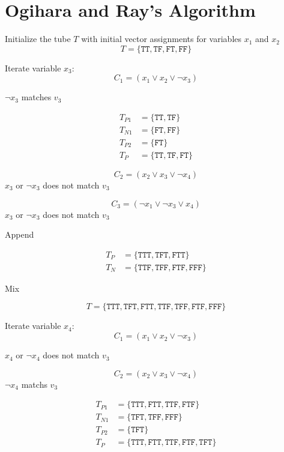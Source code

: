 \section{Ogihara and Ray's Algorithm}

Initialize the tube $T$ with initial vector assignments for variables $x_1$ and $x_2$
\[
	T = \{\texttt{TT}, \texttt{TF}, \texttt{FT}, \texttt{FF}\}
\]

\noindent Iterate variable $x_3$:
\[
C_1 = (x_1 \vee x_2 \vee \neg x_3)
\]

\noindent $\neg x_3$ matches $v_3$

\begin{align*}
T_{P1} &= \{\texttt{TT}, \texttt{TF}\}\\
T_{N1} &= \{\texttt{FT}, \texttt{FF}\}\\
T_{P2} &= \{\texttt{FT}\}\\
T_P &= \{\texttt{TT}, \texttt{TF}, \texttt{FT}\}
\end{align*}

\[
C_2 = (x_2 \vee x_3 \vee \neg x_4)
\]
\noindent $x_3$ or $\neg x_3$ does not match $v_3$

\[
C_3 = (\neg x_1 \vee \neg x_3 \vee x_4)
\]
\noindent $x_3$ or $\neg x_3$ does not match $v_3$

\noindent Append

\begin{align*}
T_P &= \{\texttt{TTT}, \texttt{TFT}, \texttt{FTT}\}\\
T_N &= \{\texttt{TTF}, \texttt{TFF}, \texttt{FTF}, \texttt{FFF}\}
\end{align*}

\noindent Mix

\[
T = \{\texttt{TTT}, \texttt{TFT}, \texttt{FTT}, \texttt{TTF}, \texttt{TFF}, \texttt{FTF}, \texttt{FFF}\}
\]


\noindent Iterate variable $x_4$:
\[
C_1 = (x_1 \vee x_2 \vee \neg x_3)
\]

\noindent $x_4$ or $\neg x_4$ does not match $v_3$

\[
C_2 = (x_2 \vee x_3 \vee \neg x_4)
\]
\noindent $\neg x_4$ matchs $v_3$

\begin{align*}
T_{P1} &= \{\texttt{TTT}, \texttt{FTT}, \texttt{TTF}, \texttt{FTF}\}\\
T_{N1} &= \{\texttt{TFT}, \texttt{TFF}, \texttt{FFF}\}\\
T_{P2} &= \{\texttt{TFT}\}\\
T_P &= \{\texttt{TTT}, \texttt{FTT}, \texttt{TTF}, \texttt{FTF}, \texttt{TFT}\}
\end{align*}

